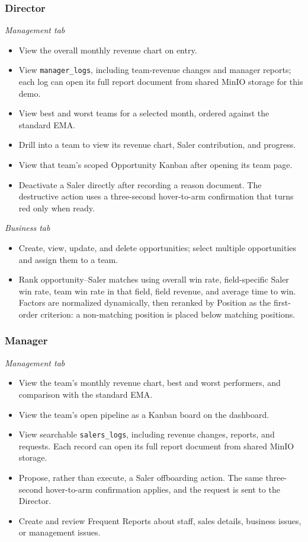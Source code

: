 \documentclass[13pt, a4paper]{article}
\begin{document}
\subsubsection{Director}

\textit{Management tab}
\begin{itemize}
    \item View the overall monthly revenue chart on entry.
    \item View \texttt{manager\_logs}, including team-revenue changes and manager reports;
        each log can open its full report document from shared MinIO storage for this demo.
    \item View best and worst teams for a selected month, ordered against the standard EMA.
    \item Drill into a team to view its revenue chart, Saler contribution, and progress.
    \item View that team's scoped Opportunity Kanban after opening its team page.
    \item Deactivate a Saler directly after recording a reason document. The destructive action
        uses a three-second hover-to-arm confirmation that turns red only when ready.
\end{itemize}

\textit{Business tab}
\begin{itemize}
    \item Create, view, update, and delete opportunities; select multiple opportunities and
        assign them to a team.
    \item Rank opportunity--Saler matches using overall win rate, field-specific Saler win
        rate, team win rate in that field, field revenue, and average time to win. Factors are
        normalized dynamically, then reranked by Position as the first-order criterion: a
        non-matching position is placed below matching positions.
\end{itemize}

\subsubsection{Manager}

\textit{Management tab}
\begin{itemize}
    \item View the team's monthly revenue chart, best and worst performers, and comparison
        with the standard EMA.
    \item View the team's open pipeline as a Kanban board on the dashboard.
    \item View searchable \texttt{salers\_logs}, including revenue changes, reports, and
        requests. Each record can open its full report document from shared MinIO storage.
    \item Propose, rather than execute, a Saler offboarding action. The same three-second
        hover-to-arm confirmation applies, and the request is sent to the Director.
    \item Create and review Frequent Reports about staff, sales details, business issues, or
        management issues.
\end{itemize}
\end{document}
